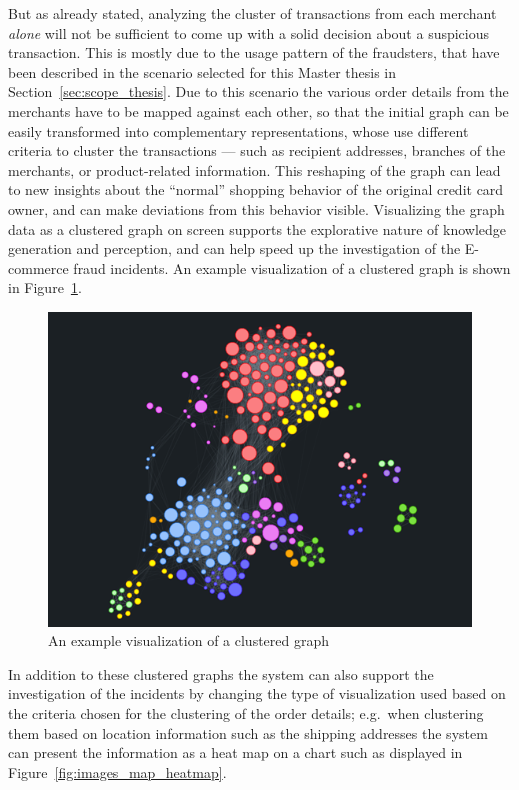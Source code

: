 But as already stated, analyzing the cluster of transactions from each merchant \emph{alone} will not be sufficient to come up with a solid decision about a suspicious transaction. This is mostly due to the usage pattern of the fraudsters, that have been described in the scenario selected for this Master thesis in Section~\ref{sec:scope_thesis}. Due to this scenario the various order details from the merchants have to be mapped against each other, so that the initial graph can be easily transformed into complementary representations, whose use different criteria to cluster the transactions --- such as recipient addresses, branches of the merchants, or product-related information. This reshaping of the graph can lead to new insights about the ``normal'' shopping behavior of the original credit card owner, and can make deviations from this behavior visible. Visualizing the graph data as a clustered graph on screen supports the explorative nature of knowledge generation and perception, and can help speed up the investigation of the \gls{E-commerce} fraud incidents. An example visualization of a clustered graph is shown in Figure~\ref{fig:images_graph_viz}. \\

\begin{figure}[!ht]
  \centering
  \includegraphics[width=0.9\columnwidth]{images/GraphViz.png}
  \caption[An example visualization of a clustered graph]{An example visualization of a clustered graph \citep{visjsshowcase}}
\label{fig:images_graph_viz}
\end{figure}

 In addition to these clustered graphs the system can also support the investigation of the incidents by changing the type of visualization used based on the criteria chosen for the clustering of the order details; e.g.\ when clustering them based on location information such as the shipping addresses the system can present the information as a heat map on a chart such as displayed in Figure~\ref{fig:images_map_heatmap}. \@

